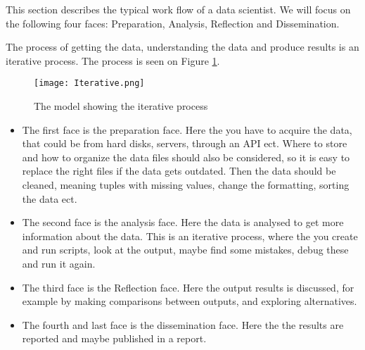 \documentclass[Report.tex]{subfiles}
\begin{document}
This section describes the typical work flow of a data scientist. We will focus on the following four faces: Preparation, Analysis, Reflection and Dissemination.

The process of getting the data, understanding the data and produce results is an iterative process. The process is seen on Figure \ref{Fig:Iterative}.

\begin{figure}
\center
\texttt{[image: Iterative.png]}
\caption{The model showing the iterative process\cite[Chapter 2]{Guo}}
\label{Fig:Iterative}
\end{figure}
\begin{itemize}


\item The first face is the preparation face. Here the you have to acquire the data, that could be from hard disks, servers, through an API ect. Where to store and how to organize the data files should also be considered, so it is easy to replace the right files if the data gets outdated. Then the data should be cleaned, meaning tuples with missing values, change the formatting, sorting the data ect.


\item The second face is the analysis face. Here the data is analysed to get more information about the data. This is an iterative process, where the you create and run scripts,  look at the output, maybe find some mistakes, debug these and run it again. 

\item The third face is the Reflection face. Here the output results is discussed, for example by making comparisons between outputs, and exploring alternatives.

\item The fourth and last face is the dissemination face. Here the the results are reported and maybe published in a report.
\cite[Chapter 2]{Guo}


\end{itemize}
\end{document}
